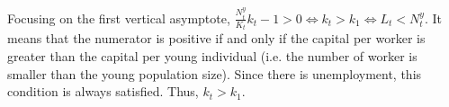 %
%







Focusing on the first vertical asymptote, $\frac{N_t^y}{K_t}k_t -1 > 0 \Leftrightarrow k_t > k_1 \Leftrightarrow L_t < N_t^y$. It means that the numerator is positive if and only if the capital per worker is greater than the capital per young individual (i.e. the number of worker is smaller than the young population size). Since there is unemployment, this condition is always satisfied. Thus, $k_t > k_1$.




